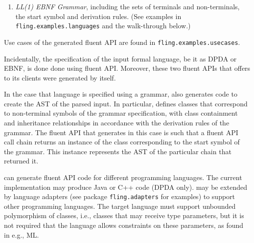 \documentclass[a4paper,UKenglish,cleveref, autoref]{darts-v2019}
\begin{document}
\begin{scope}
\begin{enumerate}
Once the automaton is built, we can request \Fling to generate a fluent API
for it.  shows how this is done.

\begin{excerpt}[language=java,label={lst:generate},caption={%
    Using \Fling to create a fluent API for \Java and \CC}
]
public static final String JavaFluentAPI = 
  new JavaAPIAdapter(
    "fling.examples.generated",  // Package name
    "AnBn",  // The class name.
      "$",   // The terminating symbol
    new NaiveNamer("fling.examples.generated", "AnBn")) //
        .printFluentAPI(new ReliableAPICompiler(dpda).compileFluentAPI());
public static final String CppFluentAPI = new CppAPIAdapter(
  "$", 
  new NaiveNamer("AnBn")) //
    .printFluentAPI(new ReliableAPICompiler(dpda).compileFluentAPI());
  \end{excerpt}

      (This and other examples can be found in \texttt{fling.examples.automata}.)
  \item \emph{LL(1) EBNF Grammar}, including the sets of terminals and non-terminals, the start symbol
    and derivation rules.
      (See examples in \texttt{fling.examples.languages} and the walk-through below.)
\end{enumerate}
Use cases of the generated fluent API are found in \texttt{fling.examples.usecases}.

Incidentally, the specification of the input formal language, be it as DPDA or
EBNF, is done done using fluent API. Moreover, these two fluent APIs that
\Fling offers to its clients were generated by \Fling itself.

In the case that language is specified using a grammar, \Fling also generates
code to create the AST of the parsed input. In particular, \Fling defines
classes that correspond
to non-terminal symbols of the grammar specification, with class containment
and inheritance relationships in accordance with the derivation rules of the
grammar. The fluent API that \Fling generates in this case is such that a
fluent API call chain returns an instance of the class corresponding to the
start symbol of the grammar. This instance represents the AST of the particular
chain that returned it.

\Fling can generate fluent API code for different programming languages. The
current implementation may produce Java or C++ code (DPDA only). \Fling may be
extended by language adapters (see package \texttt{fling.adapters} for
examples) to support other programming languages. The target language must
support unbounded polymorphism of classes, i.e., classes that may receive type
parameters, but it is not required that the language allows constraints on
these parameters, as found in e.g., ML.


\end{scope}
\end{document}
